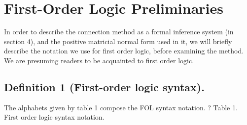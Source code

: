 \chapter{First-Order Logic Preliminaries}
\label{ch:firstorderlogicpreliminaries}

In order to describe the connection method as a formal inference system (in section 4), and the positive matricial normal form used in it, we will briefly describe the notation we use for first order logic, before examining the method. We are presuming readers to be acquainted to first order logic.

\section{Definition 1 (First-order logic syntax).}
The alphabets given by table 1 compose the FOL syntax notation.	? Table 1. First order logic syntax notation.